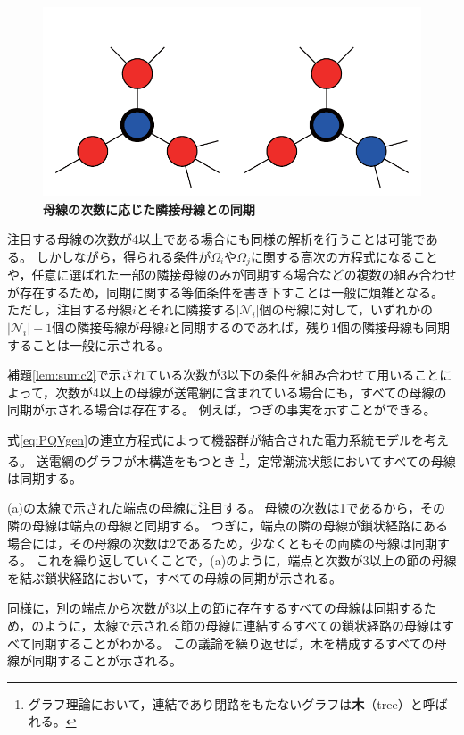 \documentclass[tombow,dvipdfmx]{corona-a5-1.1}
\begin{document}
\begin{figure}[t]
{\begin{minipage}{0.3\linewidth}
  \end{minipage}
  \label{fig:N2}
  \begin{minipage}{0.3\linewidth}
    \centering
    \includegraphics[width = .60\linewidth]{figs/3degbus}
  \end{minipage}
  \medskip
  \caption{\textbf{母線の次数に応じた隣接母線との同期}}
  \label{fig:bussync}
  }
\medskip
\end{figure}
注目する母線の次数が4以上である場合にも同様の解析を行うことは可能である。
しかしながら，得られる条件が$\Omega_i$や$\Omega_j$に関する高次の方程式になることや，任意に選ばれた一部の隣接母線のみが同期する場合などの複数の組み合わせが存在するため，同期に関する等価条件を書き下すことは一般に煩雑となる。
ただし，注目する母線$i$とそれに隣接する$|\mathcal{N}_i|$個の母線に対して，いずれかの$|\mathcal{N}_i |-1$個の隣接母線が母線$i$と同期するのであれば，残り1個の隣接母線も同期することは一般に示される。

補題\ref{lem:sumc2}で示されている次数が3以下の条件を組み合わせて用いることによって，次数が4以上の母線が送電網に含まれている場合にも，すべての母線の同期が示される場合は存在する。
例えば，つぎの事実を示すことができる。

\begin{定理}[木構造の送電網における母線の同期]
\label{thm:tree}
式\ref{eq:PQVgen}の連立方程式によって機器群が結合された電力系統モデルを考える。
送電網のグラフが木構造をもつとき
\footnote{
グラフ理論において，連結であり閉路をもたないグラフは\textbf{木}（tree）と呼ばれる。
}，定常潮流状態においてすべての母線は同期する。
\end{定理}

\begin{証明}
(a)の太線で示された端点の母線に注目する。
母線の次数は1であるから，その隣の母線は端点の母線と同期する。
つぎに，端点の隣の母線が鎖状経路にある場合には，その母線の次数は2であるため，少なくともその両隣の母線は同期する。
これを繰り返していくことで，(a)のように，端点と次数が3以上の節の母線を結ぶ鎖状経路において，すべての母線の同期が示される。

同様に，別の端点から次数が3以上の節に存在するすべての母線は同期するため，のように，太線で示される節の母線に連結するすべての鎖状経路の母線はすべて同期することがわかる。
この議論を繰り返せば，木を構成するすべての母線が同期することが示される。
\end{証明}
\end{document}
